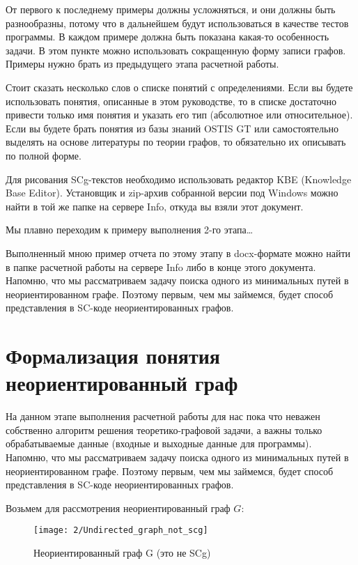 От первого к последнему примеры должны усложняться, и они должны быть
разнообразны, потому что в дальнейшем будут использоваться в качестве
тестов программы. В каждом примере должна быть показана какая-то
особенность задачи. В этом пункте можно использовать сокращенную форму
записи графов. Примеры нужно брать из предыдущего этапа расчетной
работы.

Стоит сказать несколько слов о списке понятий с определениями. Если вы
будете использовать понятия, описанные в этом руководстве, то в списке
достаточно привести только имя понятия и указать его тип (абсолютное
или относительное). Если вы будете брать понятия из базы знаний OSTIS
GT или самостоятельно выделять на основе литературы по теории графов,
то обязательно их описывать по полной форме.

Для рисования SCg-текстов необходимо использовать редактор KBE
(Knowledge Base Editor). Установщик и zip-архив собранной версии под
Windows можно найти в той же папке на сервере Info, откуда вы взяли
этот документ.

Мы плавно переходим к примеру выполнения 2-го этапа…

Выполненный мною пример отчета по этому этапу в docx-формате можно
найти в папке расчетной работы на сервере Info либо в конце этого
документа.  Напомню, что мы рассматриваем задачу поиска одного из
минимальных путей в неориентированном графе. Поэтому первым, чем мы
займемся, будет способ представления в SC-коде неориентированных
графов.


\section{Формализация понятия неориентированный граф}

На данном этапе выполнения расчетной работы для нас пока что неважен
собственно алгоритм решения теоретико-графовой задачи, а важны только
обрабатываемые данные (входные и выходные данные для
программы). Напомню, что мы рассматриваем задачу поиска одного из
минимальных путей в неориентированном графе. Поэтому первым, чем мы
займемся, будет способ представления в SC-коде неориентированных
графов.

Возьмем для рассмотрения неориентированный граф $G$:

\begin{figure}[h]
  \centering
  \texttt{[image: 2/Undirected\_graph\_not\_scg]}
  \caption{Неориентированный граф G (это не SCg)}
  \label{fig:Undirected_graph_not_scg}
\end{figure}

